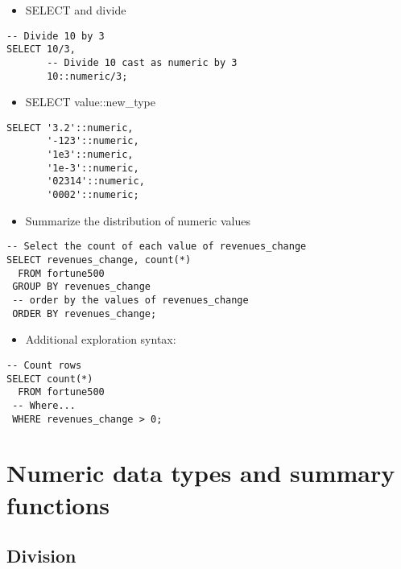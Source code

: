 \documentclass[]{book}
\providecommand{\tightlist}{%
  \setlength{\itemsep}{0pt}\setlength{\parskip}{0pt}}
\begin{document}
\begin{itemize}
\tightlist
\item
  SELECT and divide
\end{itemize}

\begin{verbatim}
-- Divide 10 by 3
SELECT 10/3,
       -- Divide 10 cast as numeric by 3
       10::numeric/3;
\end{verbatim}

\begin{itemize}
\tightlist
\item
  SELECT value::new\_type
\end{itemize}

\begin{verbatim}
SELECT '3.2'::numeric,
       '-123'::numeric,
       '1e3'::numeric,
       '1e-3'::numeric,
       '02314'::numeric,
       '0002'::numeric;
\end{verbatim}

\begin{itemize}
\tightlist
\item
  Summarize the distribution of numeric values
\end{itemize}

\begin{verbatim}
-- Select the count of each value of revenues_change
SELECT revenues_change, count(*) 
  FROM fortune500
 GROUP BY revenues_change 
 -- order by the values of revenues_change
 ORDER BY revenues_change;
\end{verbatim}

\begin{itemize}
\tightlist
\item
  Additional exploration syntax:
\end{itemize}

\begin{verbatim}
-- Count rows 
SELECT count(*)
  FROM fortune500
 -- Where...
 WHERE revenues_change > 0;
\end{verbatim}

\hypertarget{numeric-data-types-and-summary-functions}{%
\section{Numeric data types and summary functions}\label{numeric-data-types-and-summary-functions}}

\hypertarget{division}{%
\subsection{Division}\label{division}}
\end{document}
